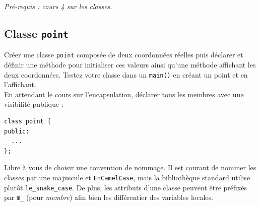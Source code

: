 \documentclass{book}
\newcommand{\inline}[1]{\texttt{#1}}
\begin{document}
\emph{Pré-requis : cours 4 sur les classes.}

\subsection{Classe \texttt{point}}

Créer une classe \texttt{point} composée de deux coordonnées réelles puis déclarer et
définir une méthode pour initialiser ces valeurs ainsi qu'une méthode affichant
les deux coordonnées. Testez votre classe dans un \inline{main()} en créant un point et en l'affichant.\\

En attendant le cours sur l'encapsulation, déclarer tous les membres avec une visibilité publique :

\begin{verbatim}
class point {
public:
  ...
};
\end{verbatim}

Libre à vous de choisir une convention de nommage. Il est courant de nommer les classes par une majuscule et \texttt{EnCamelCase}, mais la bibliothèque standard utilise plutôt \texttt{le\_snake\_case}. De plus, les attributs d'une classe peuvent être préfixés par \texttt{m\_} (pour \textit{membre}) afin bien les différentier des variables locales.
\end{document}
